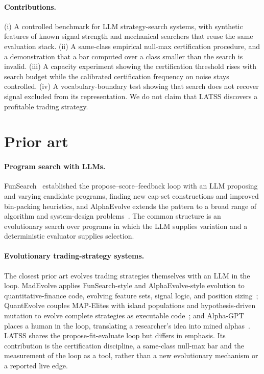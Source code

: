 \documentclass[11pt]{article}
\begin{document}
\paragraph{Contributions.} (i) A controlled benchmark for LLM strategy-search systems, with synthetic
features of known signal strength and mechanical searchers that reuse the same evaluation stack. (ii)
A same-class empirical null-max certification procedure, and a demonstration that a bar computed over a
class smaller than the search is invalid. (iii) A capacity experiment showing the certification
threshold rises with search budget while the calibrated certification frequency on noise stays
controlled. (iv) A vocabulary-boundary test showing that search does not recover signal excluded from
its representation. We do not claim that LATSS discovers a profitable trading strategy.

\section{Prior art}
\label{sec:related}

\paragraph{Program search with LLMs.} FunSearch~\cite{funsearch} established the
propose--score--feedback loop with an LLM proposing and varying candidate programs, finding new cap-set constructions and
improved bin-packing heuristics, and AlphaEvolve extends the pattern to a broad range of algorithm and
system-design problems~\cite{alphaevolve}. The common structure is an evolutionary search over programs
in which the LLM supplies variation and a deterministic evaluator supplies selection.

\paragraph{Evolutionary trading-strategy systems.} The closest prior art evolves trading strategies
themselves with an LLM in the loop. MadEvolve applies FunSearch-style and AlphaEvolve-style evolution to
quantitative-finance code, evolving feature sets, signal logic, and position sizing~\cite{madevolve};
QuantEvolve couples MAP-Elites with island populations and hypothesis-driven mutation to evolve complete
strategies as executable code~\cite{quantevolve}; and Alpha-GPT places a human in the loop, translating a
researcher's idea into mined alphas~\cite{alphagpt}. LATSS shares the propose-fit-evaluate loop but
differs in emphasis. Its contribution is the certification discipline, a same-class null-max bar and the
measurement of the loop as a tool, rather than a new evolutionary mechanism or a reported live
edge.
\end{document}
